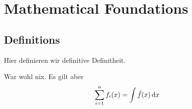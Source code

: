\chapter{Mathematical Foundations}

\section{Definitions}
\begin{definition}[Definitheit]
  Hier definieren wir definitive Definitheit.
\end{definition}

\begin{theorem}[vom X]
  War wohl nix. Es gilt aber
  \begin{align*}
    \sum_{i=1}^{n} f_i(x) = \int \hat{f}(x) \dl{x}
  \end{align*}
\end{theorem}